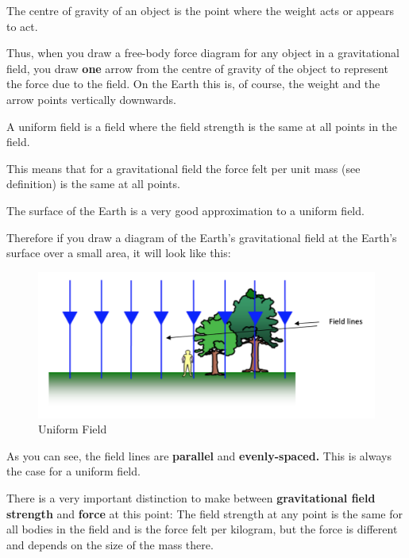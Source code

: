 \documentclass[main.tex]{subfiles}
\begin{document}

The centre of gravity of an object is the point where the weight acts or
appears to act.

Thus, when you draw a free-body force diagram for any object in a
gravitational field, you draw \textbf{one} arrow from the centre of
gravity of the object to represent the force due to the field. On the
Earth this is, of course, the weight and the arrow points vertically
downwards.


A uniform field is a field where the field strength is the same at all
points in the field.

This means that for a gravitational field the force felt per unit mass
(see definition) is the same at all points.

The surface of the Earth is a very good approximation to a uniform
field.

Therefore if you draw a diagram of the Earth's gravitational field at
the Earth's surface over a small area, it will look like this:

\begin{figure}[h]
	\begin{center}
		\includegraphics[width=\textwidth]{figs/chapt-2/figure-1.png}
	\end{center}
	\caption{Uniform Field}
\end{figure}

As you can see, the field lines are \textbf{parallel} and
\textbf{evenly-spaced.} This is always the case for a uniform field.


There is a very important distinction to make between
\textbf{gravitational field strength} and \textbf{force} at this point:
The field strength at any point is the same for all bodies in the field
and is the force felt per kilogram, but the force is different and
depends on the size of the mass there.
\end{document}
